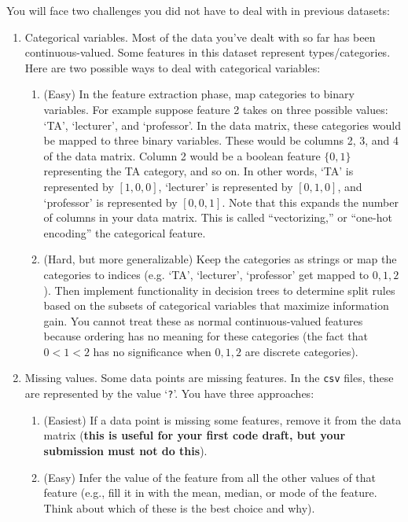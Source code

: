 You will face two challenges you did not have to deal with in previous datasets:
\begin{enumerate}
\item Categorical variables. Most of the data you've dealt with so far has been continuous-valued. Some features in this dataset represent types/categories. Here are two possible ways to deal with categorical variables:

\begin{enumerate}
  \item (Easy) In the feature extraction phase, map categories to binary variables. For example suppose feature 2 takes on three possible values: `TA', `lecturer', and `professor'. In the data matrix, these categories would be mapped to three binary variables. These would be columns 2, 3, and 4 of the data matrix. Column 2 would be a boolean feature $\{0, 1\}$ representing the TA category, and so on. In other words, `TA' is represented by $[1, 0, 0]$, `lecturer' is represented by $[0, 1, 0]$, and `professor' is represented by $[0, 0, 1]$. Note that this expands the number of columns in your data matrix. This is called ``vectorizing,'' or ``one-hot encoding'' the categorical feature.

  \item (Hard, but more generalizable) Keep the categories as strings or map the categories to indices (e.g. `TA', `lecturer', `professor' get mapped to $0, 1, 2$). Then implement functionality in decision trees to determine split rules based on the subsets of categorical variables that maximize information gain. You cannot treat these as normal continuous-valued features because ordering has no meaning for these categories (the fact that $0 < 1 < 2$ has no significance when $0, 1, 2$ are discrete categories).
\end{enumerate}

\item Missing values. Some data points are missing features. In the \verb+csv+ files, these are represented by the value `\verb+?+'. You have three approaches:
  
  \begin{enumerate}
  	\item (Easiest) If a data point is missing some features, remove it from the data matrix (\textbf{this is useful for your first code draft, but your submission must not do this}).

    \item (Easy) Infer the value of the feature from all the other values of that feature (e.g., fill it in with the mean, median, or mode of the feature. Think about which of these is the best choice and why).


\end{enumerate}
\end{enumerate}
